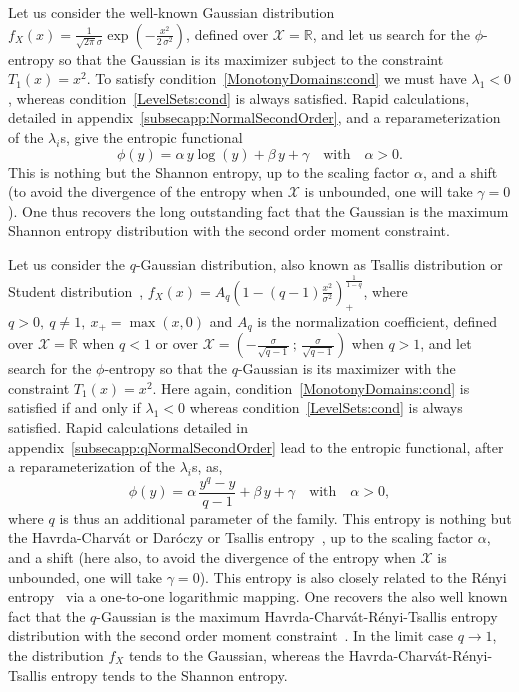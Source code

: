 \documentclass[entropy,article,submit,moreauthors,pdftex]{Definitions/mdpi}
\newcounter{GaussExample}%
\newcounter{qGaussExample}%
\def\Rset{\mathbb{R}}%
\def\X{\mathcal{X}}%
\begin{document}
\begin{Example}\label{Gauss:ex}\setcounter{GaussExample}{\value{example}}
  Let   us   consider   the   well-known   Gaussian   distribution   $f_X(x)   =
  \frac{1}{\sqrt{2 \pi} \sigma} \exp\left( - \frac{x^2}{2 \, \sigma^2} \right)$,
  defined over $\X  = \Rset$, and let  us search for the  $\phi$-entropy so that
  the Gaussian  is its maximizer subject  to the constraint $T_1(x)  = x^2$.  To
  satisfy  condition~\ref{MonotonyDomains:cond} we  must have  $\lambda_1 <  0$,
  whereas   condition~\ref{LevelSets:cond}    is   always    satisfied.    Rapid
  calculations,  detailed in  appendix~\ref{subsecapp:NormalSecondOrder}, and  a
  reparameterization of the $\lambda_i$s, give the entropic functional $$\phi(y)
  = \alpha \, y  \log(y) + \beta \, y + \gamma \quad  \mbox{with} \quad \alpha >
  0.$$  This is  nothing  but the  Shannon  entropy, up  to  the scaling  factor
  $\alpha$, and  a shift (to  avoid the divergence of  the entropy when  $\X$ is
  unbounded,  one  will  take  $\gamma  =  0$).   One  thus  recovers  the  long
  outstanding fact that the Gaussian is the maximum Shannon entropy distribution
  with the second order moment constraint.
\end{Example}
%
\begin{Example}\label{qGauss:ex}\setcounter{qGaussExample}{\value{example}}
   Let  us  consider  the  $q$-Gaussian  distribution,  also  known  as  Tsallis
   distribution or Student  distribution~\cite{CosHer03, JohKot95:v2}, $f_X(x) =
   A_q \left(  1 - (q-1) \frac{x^2}{\sigma^2}  \right)_+^{\frac{1}{1-q}}$, where
   $q >  0, \:  q \ne  1, \:  x_+ =  \max(x,0)$ and  $A_q$ is  the normalization
   coefficient, defined over  $\X = \Rset$ when $q  < 1$ or over $\X  = \left( -
   \frac{\sigma}{\sqrt{q-1}} \, ; \, \frac{\sigma}{\sqrt{q-1}} \right) $ when $q
   > 1$, and let  search for the $\phi$-entropy so that  the $q$-Gaussian is its
   maximizer   with    the   constraint    $T_1(x)   =   x^2$.     Here   again,
   condition~\ref{MonotonyDomains:cond} is satisfied if and only if $\lambda_1 <
   0$  whereas   condition~\ref{LevelSets:cond}  is  always   satisfied.   Rapid
   calculations detailed in  appendix~\ref{subsecapp:qNormalSecondOrder} lead to
   the  entropic functional,  after  a reparameterization  of the  $\lambda_i$s,
   as,  $$\phi(y) =  \alpha \,  \frac{y^q-y}{q-1} +  \beta \,  y +  \gamma \quad
   \mbox{with} \quad \alpha > 0,$$ where  $q$ is thus an additional parameter of
   the family.  This entropy is nothing but the Havrda-Charv\'at or Dar\'oczy or
   Tsallis entropy~\cite{HavCha67,  Dar70, Tsa88,  CosHer03}, up to  the scaling
   factor  $\alpha$, and  a shift  (here also,  to avoid  the divergence  of the
   entropy when $\X$ is unbounded, one will take $\gamma = 0$).  This entropy is
   also closely  related to  the R\'enyi  entropy~\cite{Ren61} via  a one-to-one
   logarithmic  mapping.   One  recovers  the  also well  known  fact  that  the
   $q$-Gaussian   is   the  maximum   Havrda-Charv\'at-R\'enyi-Tsallis   entropy
   distribution with the second order moment constraint~\cite{CosHer03}.  In the
   limit case $q  \to 1$, the distribution $f_X$ tends  to the Gaussian, whereas
   the Havrda-Charv\'at-R\'enyi-Tsallis entropy tends to the Shannon entropy.
\end{Example}
\end{document}
